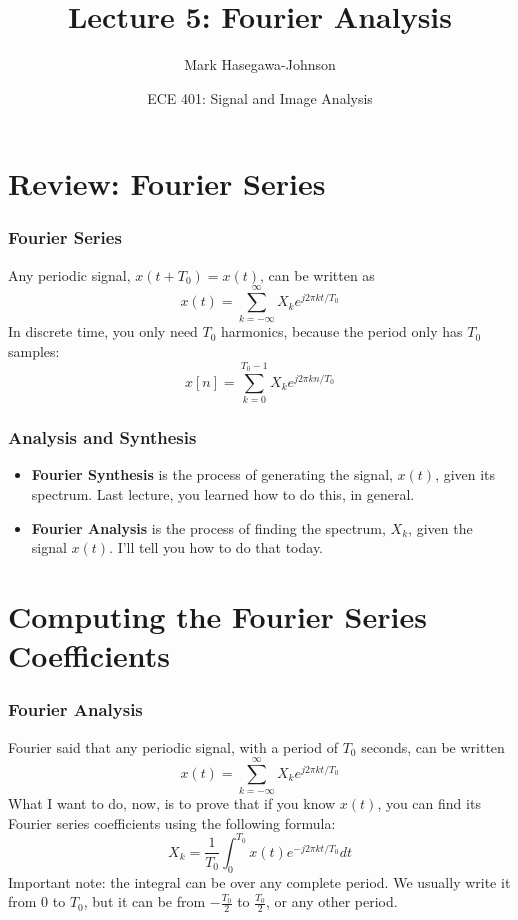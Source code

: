 \documentclass{beamer}
\title{Lecture 5: Fourier Analysis}
\author{Mark Hasegawa-Johnson}
\date{ECE 401: Signal and Image Analysis}
\begin{document}
\begin{frame}
  \maketitle
\end{frame}

\begin{frame}
  \tableofcontents
\end{frame}

\section[Review]{Review: Fourier Series}
\setcounter{subsection}{1}

\begin{frame}
  \frametitle{Fourier Series}

  Any periodic signal, $x(t+T_0) = x(t)$, can be written as
  \[
  x(t) = \sum_{k=-\infty}^\infty X_k e^{j2\pi k t/T_0}
  \]
  In discrete time, you only need $T_0$ harmonics, because
  the period only has $T_0$ samples:
  \[
  x[n] = \sum_{k=0}^{T_0-1} X_k e^{j2\pi kn/T_0}
  \]

  
\end{frame}

\begin{frame}
  \frametitle{Analysis and Synthesis}

  \begin{itemize}
  \item {\bf Fourier Synthesis} is the process of generating the
    signal, $x(t)$, given its spectrum.  Last lecture, you learned
    how to do this, in general.
  \item {\bf Fourier Analysis} is the process of finding the spectrum,
    $X_k$, given the signal $x(t)$.  I'll tell you how to do that today.
  \end{itemize}
\end{frame}

\section[Coefficients]{Computing the Fourier Series Coefficients}
\setcounter{subsection}{1}

\begin{frame}
  \frametitle{Fourier Analysis}

  Fourier said that any periodic signal, with a period of $T_0$
  seconds, can be written
  \[
  x(t) = \sum_{k=-\infty}^\infty X_k e^{j2\pi kt/T_0}
  \]
  What I want to do, now, is to prove that if you know $x(t)$, you can
  find its Fourier series coefficients using the following formula:
  \[
  X_k = \frac{1}{T_0}\int_0^{T_0} x(t)e^{-j2\pi kt/T_0}dt
  \]
  Important note: the integral can be over any complete period.  We
  usually write it from $0$ to $T_0$, but it can be from
  $-\frac{T_0}{2}$ to $\frac{T_0}{2}$, or any other period.
\end{frame}
\end{document}
